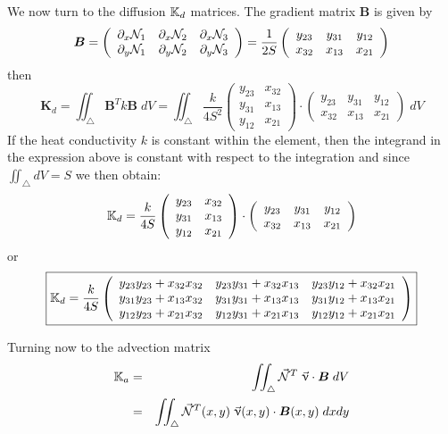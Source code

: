 We now turn to the diffusion ${\mathbb{K}}_d$ matrices.
The gradient matrix ${\bm B}$ is given by 
\[
{\bm B} = 
\left(
\begin{array}{ccc}
\partial_x {\mathcal{N}}_1 & \partial_x {\mathcal{N}}_2 & \partial_x {\mathcal{N}}_3 \\
\partial_y {\mathcal{N}}_1 & \partial_y {\mathcal{N}}_2 & \partial_y {\mathcal{N}}_3 \\
\end{array}
\right)
=
\frac{1}{2S}
\left(
\begin{array}{ccc}
y_{23} & y_{31} & y_{12} \\
x_{32} & x_{13} & x_{21}
\end{array}
\right)
\]
then 
\[
{\bm K}_d 
= \iint_\triangle {\bm B}^T k {\bm B} \; dV
= \iint_\triangle \frac{k}{4S^2}
\left(
\begin{array}{cc}
y_{23} & x_{32} \\ 
y_{31} & x_{13} \\
y_{12} & x_{21}
\end{array}
\right)
\cdot
\left(
\begin{array}{ccc}
y_{23} & y_{31} & y_{12} \\
x_{32} & x_{13} & x_{21}
\end{array}
\right)
\; dV
\]
If the heat conductivity $k$ is constant within the element, then 
the integrand in the expression above is constant with respect to the 
integration and since $\iint_\triangle dV = S$ we then obtain:
\[
{\mathbb{K}}_d 
= \frac{k}{4S}
\left(
\begin{array}{cc}
y_{23} & x_{32} \\ 
y_{31} & x_{13} \\
y_{12} & x_{21}
\end{array}
\right)
\cdot
\left(
\begin{array}{ccc}
y_{23} & y_{31} & y_{12} \\
x_{32} & x_{13} & x_{21}
\end{array}
\right)
\]
or
\[
\boxed{
{\mathbb{K}}_d 
= \frac{k}{4S}
\left(
\begin{array}{ccc}
y_{23}y_{23} + x_{32}x_{32} & y_{23}y_{31} + x_{32}x_{13} & y_{23}y_{12} + x_{32}x_{21}  \\ 
y_{31}y_{23} + x_{13}x_{32} & y_{31}y_{31} + x_{13}x_{13} & y_{31}y_{12} + x_{13}x_{21}  \\ 
y_{12}y_{23} + x_{21}x_{32} & y_{12}y_{31} + x_{21}x_{13} & y_{12}y_{12} + x_{21}x_{21} 
\end{array}
\right)
}
\]



Turning now to the advection matrix
\begin{eqnarray}
{\mathbb{K}}_a 
&=& \iint_\triangle \vec{{\mathcal{N}}}^T  \; \vec{\upnu}\cdot {\bm B} \; dV \nonumber\\
&=& \iint_\triangle \vec{{\mathcal{N}}}^T(x,y) \; \vec{\upnu}(x,y) \cdot {\bm B}(x,y) \; dx dy \nonumber
\end{eqnarray}

